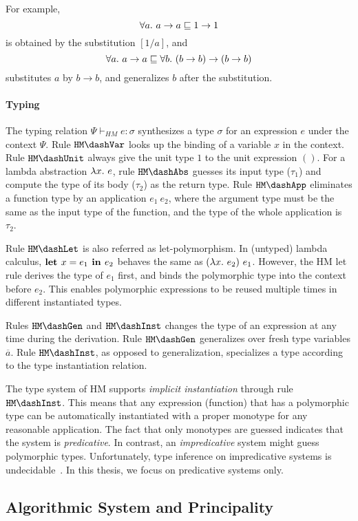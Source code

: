 For example, $$\all a \to a \sqsubseteq 1 \to 1$$
is obtained by the substitution $[1/a]$, and
$$\all a \to a \sqsubseteq \all[b] (b \to b) \to (b \to b)$$
substitutes $a$ by $b \to b$, and generalizes $b$ after the substitution.


\paragraph{Typing}
The typing relation $\Psi \vdash_{HM} e:\sigma$ synthesizes a type $\sigma$ for
an expression $e$ under the context $\Psi$.
Rule $\mathtt{HM \dash Var}$ looks up the binding of a variable $x$ in the context.
Rule $\mathtt{HM \dash Unit}$ always give the unit type $1$ to the unit expression $()$.
For a lambda abstraction $\lam e$, rule $\mathtt{HM \dash Abs}$ guesses its input type ($\tau_1$)
and compute the type of its body ($\tau_2$) as the return type.
Rule $\mathtt{HM \dash App}$ eliminates a function type by an application $e_1~e_2$,
where the argument type must be the same as the input type of the function,
and the type of the whole application is $\tau_2$.

Rule $\mathtt{HM \dash Let}$ is also referred as let-polymorphism.
In (untyped) lambda calculus, $\textbf{let } x={e_1} \textbf{ in } {e_2}$ behaves the same as $(\lam e_2)~e_1$.
However, the HM let rule derives the type of $e_1$ first,
and binds the polymorphic type into the context before $e_2$.
This enables polymorphic expressions to be reused multiple times in different instantiated types.

Rules $\mathtt{HM \dash Gen}$ and $\mathtt{HM \dash Inst}$ changes the type of an expression
at any time during the derivation.
Rule $\mathtt{HM \dash Gen}$ generalizes over fresh type variables $\overline{a}$.
Rule $\mathtt{HM \dash Inst}$, as opposed to generalization, specializes a type
according to the type instantiation relation.

The type system of HM supports \emph{implicit instantiation} through
rule $\mathtt{HM \dash Inst}$.
This means that any expression (function) that has a polymorphic type
can be automatically instantiated with a proper monotype for any reasonable application.
The fact that only monotypes are guessed indicates that the system is \emph{predicative}.
In contrast, an \emph{impredicative} system might guess polymorphic types.
Unfortunately, type inference on impredicative systems is undecidable~\cite{wells1999typability}.
In this thesis, we focus on predicative systems only.

\subsection{Algorithmic System and Principality}

